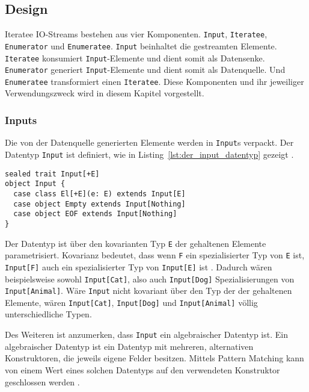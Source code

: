 \documentclass[draft=false
              ,paper=a4
              ,twoside=false
              ,fontsize=11pt
              ,headsepline
              ,BCOR10mm
              ,DIV11
              ]{scrbook}
\begin{document}
\subsection{Design} %
\label{sub:design}

Iteratee IO-Streams bestehen aus vier Komponenten.
\lstinline|Input|, \lstinline|Iteratee|, \lstinline|Enumerator| und \lstinline|Enumeratee|.
\lstinline|Input| beinhaltet die gestreamten Elemente.
\lstinline|Iteratee| konsumiert \lstinline|Input|-Elemente und dient somit als Datensenke.
\lstinline|Enumerator| generiert \lstinline|Input|-Elemente und dient somit als Datenquelle.
Und \lstinline|Enumeratee| transformiert einen \lstinline|Iteratee|.
Diese Komponenten und ihr jeweiliger Verwendungszweck wird in diesem Kapitel vorgestellt.


\subsubsection{Inputs} %
\label{ssub:design_inputs}

Die von der Datenquelle generierten Elemente werden in \lstinline|Input|s verpackt.
Der Datentyp \lstinline|Input| ist definiert, wie in Listing~\ref{lst:der_input_datentyp} gezeigt \cite[vgl.][Zeile.~224]{play_iteratee_source_code}.

\begin{lstlisting}[caption=Der Input-Datentyp, label=lst:der_input_datentyp]
sealed trait Input[+E]
object Input {
  case class El[+E](e: E) extends Input[E]
  case object Empty extends Input[Nothing]
  case object EOF extends Input[Nothing]
}
\end{lstlisting}

Der Datentyp ist über den kovarianten Typ \lstinline|E| der gehaltenen Elemente parametrisiert.
Kovarianz bedeutet, dass wenn \lstinline|F| ein spezialisierter Typ von \lstinline|E| ist, \lstinline|Input[F]| auch ein spezialisierter Typ von \lstinline|Input[E]| ist \cite[vgl.][S.~11]{variance}.
Dadurch wären beispielsweise sowohl \lstinline|Input[Cat]|, also auch \lstinline|Input[Dog]| Spezialisierungen von \lstinline|Input[Animal]|.
Wäre \lstinline|Input| nicht kovariant über den Typ der der gehaltenen Elemente, wären \lstinline|Input[Cat]|, \lstinline|Input[Dog]| und \lstinline|Input[Animal]| völlig unterschiedliche Typen.

Des Weiteren ist anzumerken, dass \lstinline|Input| ein algebraischer Datentyp ist.
Ein algebraischer Datentyp ist ein Datentyp mit mehreren, alternativen Konstruktoren, die jeweils eigene Felder besitzen.
Mittels Pattern Matching kann von einem Wert eines solchen Datentyps auf den verwendeten Konstruktor geschlossen werden \cite[vgl.][S.~14--15]{algebraic_data_type}.
\end{document}

